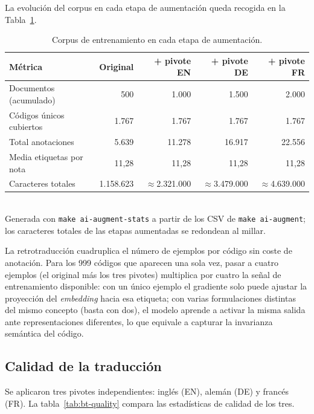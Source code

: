 La evolución del corpus en cada etapa de aumentación queda recogida en la Tabla~\ref{tab:aug-results}.

\begin{table}[h]
\centering
\small
\caption{Corpus de entrenamiento en cada etapa de aumentación.}
\label{tab:aug-results}
\begin{tabular}{lrrrr}
\hline
\textbf{Métrica} & \textbf{Original} & \textbf{+ pivote EN} & \textbf{+ pivote DE} & \textbf{+ pivote FR} \\
\hline
Documentos (acumulado)      & 500       & 1.000   & 1.500   & 2.000   \\
Códigos únicos cubiertos    & 1.767     & 1.767   & 1.767   & 1.767   \\
Total anotaciones           & 5.639     & 11.278  & 16.917  & 22.556  \\
Media etiquetas por nota    & 11,28     & 11,28   & 11,28   & 11,28   \\
Caracteres totales          & 1.158.623 & $\approx$2.321.000 & $\approx$3.479.000 & $\approx$4.639.000 \\
\hline
\end{tabular}
\\[4pt]
{\footnotesize Generada con \texttt{make ai-augment-stats} a partir de los CSV de \texttt{make ai-augment}; los caracteres totales de las etapas aumentadas se redondean al millar.}
\end{table}

La retrotraducción cuadruplica el número de ejemplos por código sin coste de anotación. Para los 999 códigos que aparecen una sola vez, pasar a cuatro ejemplos (el original más los tres pivotes) multiplica por cuatro la señal de entrenamiento disponible: con un único ejemplo el gradiente solo puede ajustar la proyección del \emph{embedding} hacia esa etiqueta; con varias formulaciones distintas del mismo concepto (basta con dos), el modelo aprende a activar la misma salida ante representaciones diferentes, lo que equivale a capturar la invarianza semántica del código.

\subsection{Calidad de la traducción}

Se aplicaron tres pivotes independientes: inglés (EN), alemán (DE) y francés (FR). La tabla~\ref{tab:bt-quality} compara las estadísticas de calidad de los tres.

